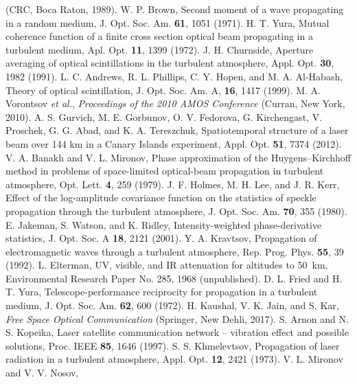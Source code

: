 \documentclass[aps,pra,twocolumn,a4paper,nofootinbib,preprintnumbers] {revtex4-1}
\begin{document}
\begin{thebibliography}{99}
        (CRC, Boca Raton, 1989).
	W. P. Brown,
	Second moment of a wave propagating in a random medium,
	J. Opt. Soc. Am. \textbf{61}, 1051 (1971).
	H. T. Yura,
	Mutual coherence function of a finite cross section optical beam propagating in a turbulent medium,
	Apl. Opt. \textbf{11}, 1399 (1972).
	J. H. Churnside,
	Aperture averaging of optical scintillations in the turbulent atmosphere,
	Appl. Opt. \textbf{30}, 1982 (1991).
        L. C. Andrews, R. L. Phillips, C. Y. Hopen, and M. A. Al-Habash,
        Theory of optical scintillation,
        J. Opt. Soc. Am. A, \textbf{16}, 1417 (1999).
 M. A. Vorontsov \textit{et al.},
	\textit{Proceedings of the 2010 AMOS Conference} (Curran, New York, 2010).
 A. S. Gurvich, M. E. Gorbunov, O. V. Fedorova, G. Kirchengast, V. Proschek, G. G. Abad, and K. A. Tereszchuk,
	Spatiotemporal structure of a laser beam over 144 km in a Canary Islands experiment,
	Appl. Opt. \textbf{51}, 7374 (2012).
	V. A. Banakh and V. L. Mironov,
	Phase approximation of the Huygens–Kirchhoff method in problems of  space-limited optical-beam propagation in turbulent atmosphere,
	Opt. Lett. \textbf{4}, 259 (1979).
	J. F. Holmes, M. H. Lee, and J. R. Kerr,
	Effect of the log-amplitude covariance function on the statistics of speckle propagation through the turbulent atmosphere,
	J. Opt. Soc. Am. \textbf{70}, 355 (1980).
	E. Jakeman, S. Watson, and K. Ridley,
	Intensity-weighted phase-derivative statistics,
	J. Opt. Soc. A \textbf{18}, 2121 (2001).
	Y. A. Kravtsov,
	Propagation of electromagnetic waves through a turbulent atmosphere,
	Rep. Prog. Phys. \textbf{55}, 39 (1992).
	L. Elterman,
	UV, visible, and IR attenuation for altitudes to 50~km,
	Environmental  Research Paper No. 285,  1968 (unpublished).
	D. L. Fried and H. T. Yura,
	Telescope-performance reciprocity for propagation in a turbulent medium,
	J. Opt. Soc. Am. \textbf{62}, 600 (1972).
	H. Kaushal, V. K. Jain, and S. Kar,
	\textit{Free Space Optical Communication}
	(Springer, New Dehli, 2017).
        S. Arnon and N. S. Kopeika,
        Laser satellite communication network -- vibration effect and possible solutions,
        Proc. IEEE \textbf{85}, 1646 (1997).
	S. S. Khmelevtsov,
	Propagation of laser radiation in a turbulent atmosphere,
	Appl. Opt. \textbf{12}, 2421 (1973).
	V. L. Mironov and V. V. Nosov,

\end{thebibliography}
\end{document}
